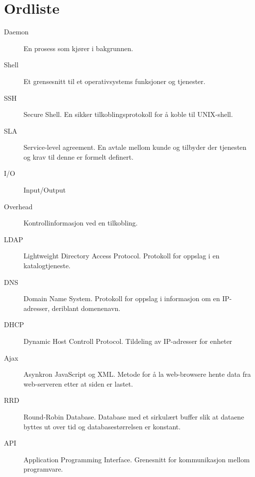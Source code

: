 \chapter*{Ordliste}
\begin{description}
	\item[Daemon] En prosess som kjører i bakgrunnen.
	\item[Shell] Et grensesnitt til et operativsystems funksjoner og tjenester.
	\item[SSH] Secure Shell. En sikker tilkoblingsprotokoll for å koble til UNIX-shell.
	\item[SLA] Service-level agreement. En avtale mellom kunde og tilbyder der tjenesten og krav til denne er formelt definert.
	\item[I/O] Input/Output
	\item[Overhead] Kontrollinformasjon ved en tilkobling.
	\item[LDAP] Lightweight Directory Access Protocol. Protokoll for oppslag i en katalogtjeneste.
	\item[DNS] Domain Name System. Protokoll for oppslag i informasjon om en IP-adresser, deriblant domenenavn.
	\item[DHCP] Dynamic Host Controll Protocol. Tildeling av IP-adresser for enheter
	\item[Ajax] Asynkron JavaScript og XML. Metode for å la web-browsere hente data fra web-serveren etter at siden er lastet.
	\item[RRD] Round-Robin Database. Database med et sirkulært buffer slik at dataene byttes ut over tid og databasestørrelsen er konstant.
	\item[API] Application Programming Interface. Grenesnitt for kommunikasjon mellom programvare.
\end{description}
